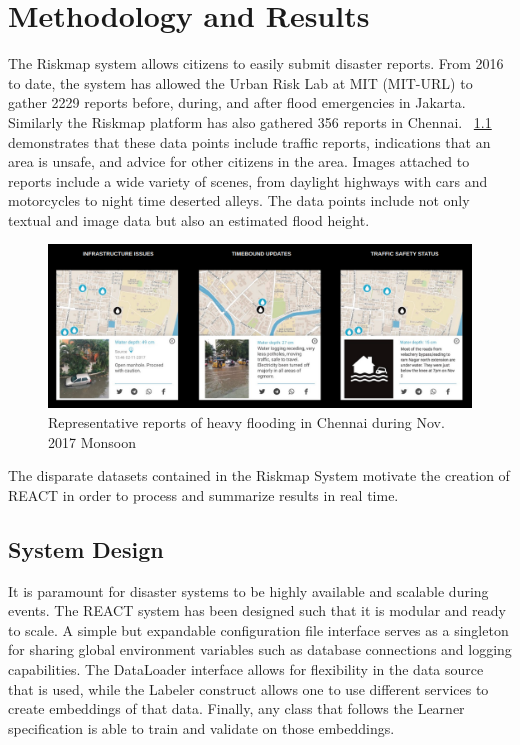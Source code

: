\chapter{Methodology and Results}
The Riskmap system allows citizens to easily submit
disaster reports. From 2016 to date, the system has allowed the Urban Risk Lab
at MIT (MIT-URL) to gather 2229 reports before, during, and after flood
emergencies in Jakarta. Similarly the Riskmap platform has also gathered 356
reports in Chennai. \figureautorefname{}~\ref{fig:ch_typical_reports} demonstrates
that these data points include traffic reports, indications
that an area is unsafe, and advice for other citizens in the area.  Images
attached to reports include a wide variety of scenes, from daylight highways
with cars and motorcycles to night time deserted alleys. The data points include
not only textual and image data but also an estimated flood height.

\begin{figure}[ht]
    \centering
    \captionsetup{justification=centering}
    \includegraphics[width=\textwidth]{images/ch/typical_reports.png}
    \caption{Representative reports of heavy flooding in Chennai during Nov.
    2017 Monsoon }\label{fig:ch_typical_reports}
\end{figure}

The disparate datasets contained in the Riskmap System motivate the creation of
REACT in order to process and summarize results in real time.

\section{System Design}
It is paramount for disaster systems to be highly available and scalable during
events. The REACT system has been designed such that it is modular and ready to
scale. A simple but expandable configuration file interface serves as a
singleton for sharing global environment variables such as database connections
and logging capabilities. The DataLoader interface allows for flexibility in the
data source that is used, while the Labeler construct allows one to use
different services to create embeddings of that data. Finally, any class that
follows the Learner specification is able to train and validate on those
embeddings.

